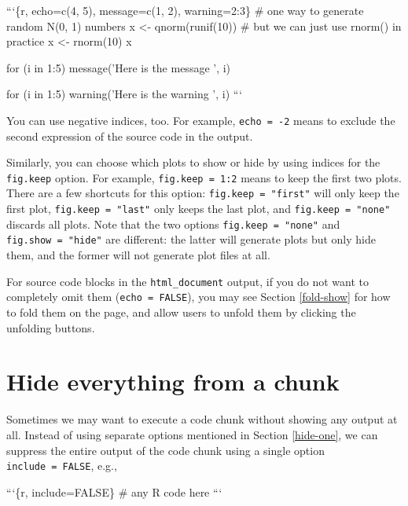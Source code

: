 \documentclass[
  11pt,
]{krantz}
\newenvironment{Shaded}{\begin{snugshade}}{\end{snugshade}}
\newcommand{\BaseNTok}[1]{\textcolor[rgb]{0.06,0.06,0.06}{#1}}
\begin{document}
\begin{Shaded}
\begin{Highlighting}[]
\BaseNTok{```\{r, echo=c(4, 5), message=c(1, 2), warning=2:3\}}
\BaseNTok{# one way to generate random N(0, 1) numbers}
\BaseNTok{x <- qnorm(runif(10))}
\BaseNTok{# but we can just use rnorm() in practice}
\BaseNTok{x <- rnorm(10)}
\BaseNTok{x}

\BaseNTok{for (i in 1:5) message('Here is the message ', i)}

\BaseNTok{for (i in 1:5) warning('Here is the warning ', i)}
\BaseNTok{```}
\end{Highlighting}
\end{Shaded}

You can use negative indices, too. For example, \texttt{echo\ =\ -2} means to exclude the second expression of the source code in the output.

Similarly, you can choose which plots to show or hide by using indices for the \texttt{fig.keep} option. For example, \texttt{fig.keep\ =\ 1:2} means to keep the first two plots. There are a few shortcuts for this option: \texttt{fig.keep\ =\ "first"} will only keep the first plot, \texttt{fig.keep\ =\ "last"} only keeps the last plot, and \texttt{fig.keep\ =\ "none"} discards all plots. Note that the two options \texttt{fig.keep\ =\ "none"} and \texttt{fig.show\ =\ "hide"} are different: the latter will generate plots but only hide them, and the former will not generate plot files at all.

For source code blocks in the \texttt{html\_document} output, if you do not want to completely omit them (\texttt{echo\ =\ FALSE}), you may see Section \ref{fold-show} for how to fold them on the page, and allow users to unfold them by clicking the unfolding buttons.

\hypertarget{hide-all}{%
\section{Hide everything from a chunk}\label{hide-all}}

Sometimes we may want to execute a code chunk without showing any output at all. Instead of using separate options mentioned in Section \ref{hide-one}, we can suppress the entire output of the code chunk using a single option \texttt{include\ =\ FALSE}, e.g.,

\begin{Shaded}
\begin{Highlighting}[]
\BaseNTok{```\{r, include=FALSE\}}
\BaseNTok{# any R code here}
\BaseNTok{```}
\end{Highlighting}
\end{Shaded}
\end{document}
